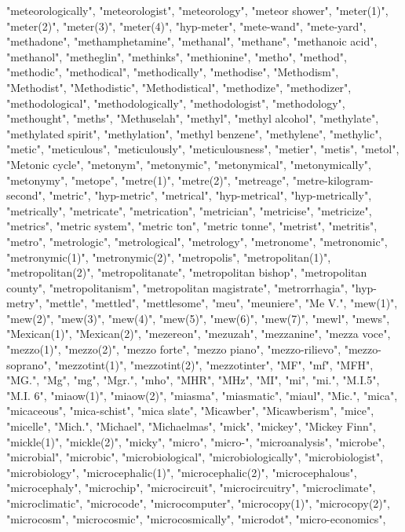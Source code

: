 "meteorologically",
"meteorologist",
"meteorology",
"meteor shower",
"meter(1)",
"meter(2)",
"meter(3)",
"meter(4)",
"hyp-meter",
"mete-wand",
"mete-yard",
"methadone",
"methamphetamine",
"methanal",
"methane",
"methanoic acid",
"methanol",
"metheglin",
"methinks",
"methionine",
"metho",
"method",
"methodic",
"methodical",
"methodically",
"methodise",
"Methodism",
"Methodist",
"Methodistic",
"Methodistical",
"methodize",
"methodizer",
"methodological",
"methodologically",
"methodologist",
"methodology",
"methought",
"meths",
"Methuselah",
"methyl",
"methyl alcohol",
"methylate",
"methylated spirit",
"methylation",
"methyl benzene",
"methylene",
"methylic",
"metic",
"meticulous",
"meticulously",
"meticulousness",
"metier",
"metis",
"metol",
"Metonic cycle",
"metonym",
"metonymic",
"metonymical",
"metonymically",
"metonymy",
"metope",
"metre(1)",
"metre(2)",
"metreage",
"metre-kilogram-second",
"metric",
"hyp-metric",
"metrical",
"hyp-metrical",
"hyp-metrically",
"metrically",
"metricate",
"metrication",
"metrician",
"metricise",
"metricize",
"metrics",
"metric system",
"metric ton",
"metric tonne",
"metrist",
"metritis",
"metro",
"metrologic",
"metrological",
"metrology",
"metronome",
"metronomic",
"metronymic(1)",
"metronymic(2)",
"metropolis",
"metropolitan(1)",
"metropolitan(2)",
"metropolitanate",
"metropolitan bishop",
"metropolitan county",
"metropolitanism",
"metropolitan magistrate",
"metrorrhagia",
"hyp-metry",
"mettle",
"mettled",
"mettlesome",
"meu",
"meuniere",
"Me V.",
"mew(1)",
"mew(2)",
"mew(3)",
"mew(4)",
"mew(5)",
"mew(6)",
"mew(7)",
"mewl",
"mews",
"Mexican(1)",
"Mexican(2)",
"mezereon",
"mezuzah",
"mezzanine",
"mezza voce",
"mezzo(1)",
"mezzo(2)",
"mezzo forte",
"mezzo piano",
"mezzo-rilievo",
"mezzo-soprano",
"mezzotint(1)",
"mezzotint(2)",
"mezzotinter",
"MF",
"mf",
"MFH",
"MG.",
"Mg",
"mg",
"Mgr.",
"mho",
"MHR",
"MHz",
"MI",
"mi",
"mi.",
"M.I.5",
"M.I. 6",
"miaow(1)",
"miaow(2)",
"miasma",
"miasmatic",
"miaul",
"Mic.",
"mica",
"micaceous",
"mica-schist",
"mica slate",
"Micawber",
"Micawberism",
"mice",
"micelle",
"Mich.",
"Michael",
"Michaelmas",
"mick",
"mickey",
"Mickey Finn",
"mickle(1)",
"mickle(2)",
"micky",
"micro",
"micro-",
"microanalysis",
"microbe",
"microbial",
"microbic",
"microbiological",
"microbiologically",
"microbiologist",
"microbiology",
"microcephalic(1)",
"microcephalic(2)",
"microcephalous",
"microcephaly",
"microchip",
"microcircuit",
"microcircuitry",
"microclimate",
"microclimatic",
"microcode",
"microcomputer",
"microcopy(1)",
"microcopy(2)",
"microcosm",
"microcosmic",
"microcosmically",
"microdot",
"micro-economics",
